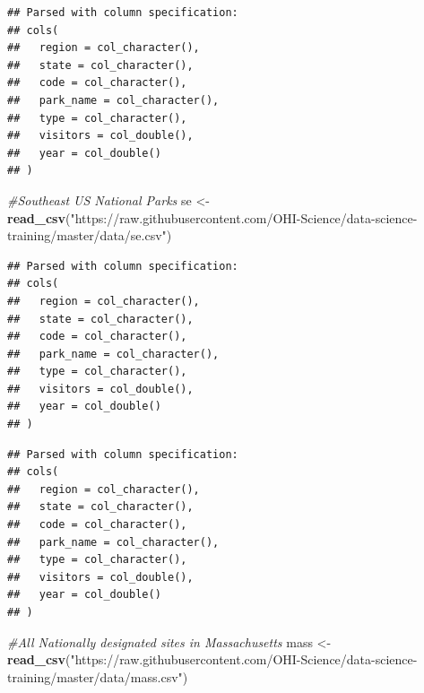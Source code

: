 \documentclass[]{book}
\newenvironment{Shaded}{\begin{snugshade}}{\end{snugshade}}
\newcommand{\CommentTok}[1]{\textcolor[rgb]{0.56,0.35,0.01}{\textit{#1}}}
\newcommand{\DecValTok}[1]{\textcolor[rgb]{0.00,0.00,0.81}{#1}}
\newcommand{\KeywordTok}[1]{\textcolor[rgb]{0.13,0.29,0.53}{\textbf{#1}}}
\newcommand{\NormalTok}[1]{#1}
\newcommand{\StringTok}[1]{\textcolor[rgb]{0.31,0.60,0.02}{#1}}
\begin{document}
\begin{verbatim}
## Parsed with column specification:
## cols(
##   region = col_character(),
##   state = col_character(),
##   code = col_character(),
##   park_name = col_character(),
##   type = col_character(),
##   visitors = col_double(),
##   year = col_double()
## )
\end{verbatim}

\begin{Shaded}
\begin{Highlighting}[]
\CommentTok{#Southeast US National Parks}
\NormalTok{se <-}\StringTok{ }\KeywordTok{read_csv}\NormalTok{(}\StringTok{"https://raw.githubusercontent.com/OHI-Science/data-science-training/master/data/se.csv"}\NormalTok{)}
\end{Highlighting}
\end{Shaded}

\begin{verbatim}
## Parsed with column specification:
## cols(
##   region = col_character(),
##   state = col_character(),
##   code = col_character(),
##   park_name = col_character(),
##   type = col_character(),
##   visitors = col_double(),
##   year = col_double()
## )
\end{verbatim}

\begin{Shaded}
\end{Shaded}

\begin{verbatim}
## Parsed with column specification:
## cols(
##   region = col_character(),
##   state = col_character(),
##   code = col_character(),
##   park_name = col_character(),
##   type = col_character(),
##   visitors = col_double(),
##   year = col_double()
## )
\end{verbatim}

\begin{Shaded}
\begin{Highlighting}[]
\CommentTok{#All Nationally designated sites in Massachusetts}
\NormalTok{mass <-}\StringTok{ }\KeywordTok{read_csv}\NormalTok{(}\StringTok{"https://raw.githubusercontent.com/OHI-Science/data-science-training/master/data/mass.csv"}\NormalTok{)}
\end{Highlighting}
\end{Shaded}
\end{document}

